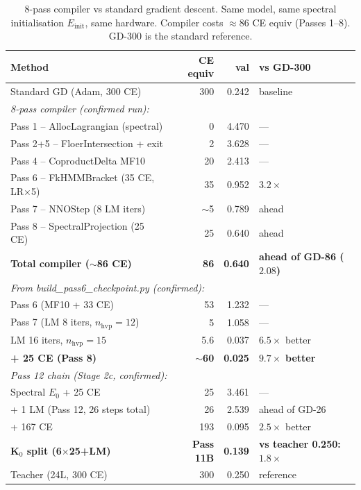 \documentclass[11pt]{amsart}
\begin{document}
\begin{table}[htbp]
\centering\small
\caption{8-pass compiler vs standard gradient descent.
  Same model, same spectral initialisation $E_\mathrm{init}$, same hardware.
  Compiler costs $\approx 86$ CE equiv (Passes 1--8).
  GD-300 is the standard reference.}
\label{tab:benchmark}
\begin{tabular}{lrrl}
\toprule
\textbf{Method} & \textbf{CE equiv} & \textbf{val} & \textbf{vs GD-300} \\
\midrule
Standard GD (Adam, 300 CE)            & 300 & 0.242 & baseline \\
\midrule
\multicolumn{4}{l}{\textit{8-pass compiler (confirmed run):}} \\
Pass 1 -- AllocLagrangian (spectral)  &   0 & 4.470 & --- \\
Pass 2+5 -- FloerIntersection + exit  &   2 & 3.628 & --- \\
Pass 4 -- CoproductDelta MF10         &  20 & 2.413 & --- \\
Pass 6 -- FkHMMBracket (35 CE, LR$\times$5) & 35 & 0.952 & $3.2\times$ \\
Pass 7 -- NNOStep (8 LM iters)        & $\sim$5 & 0.789 & ahead \\
Pass 8 -- SpectralProjection (25 CE)  &  25 & 0.640 & ahead \\
\textbf{Total compiler ($\sim$86 CE)} & \textbf{86} & \textbf{0.640}
  & \textbf{ahead of GD-86 ($2.08$)} \\
\midrule
\multicolumn{4}{l}{\textit{From build\_pass6\_checkpoint.py (confirmed):}} \\
Pass 6 (MF10 + 33 CE)                & 53  & 1.232 & --- \\
Pass 7 (LM 8 iters, $n_\text{hvp}=12$) & 5 & 1.058 & --- \\
LM 16 iters, $n_\text{hvp}=15$       & 5.6 & 0.037 & $6.5\times$ better \\
\textbf{+ 25 CE (Pass 8)}            & \textbf{$\sim$60} & \textbf{0.025}
  & $\mathbf{9.7\times}$\textbf{ better} \\
\midrule
\multicolumn{4}{l}{\textit{Pass 12 chain (Stage 2c, confirmed):}} \\
Spectral $E_0$ + 25 CE                &  25 & 3.461 & --- \\
+ 1 LM (Pass 12, 26 steps total)      &  26 & 2.539 & ahead of GD-26 \\
+ 167 CE                              & 193 & 0.095 & $2.5\times$ better \\
\textbf{K$_0$ split (6$\times$25+LM)} & \textbf{Pass 11B} & \textbf{0.139}
  & \textbf{vs teacher 0.250: $1.8\times$} \\
Teacher (24L, 300 CE)                 & 300 & 0.250 & reference \\
\bottomrule
\end{tabular}
\end{table}
\end{document}
